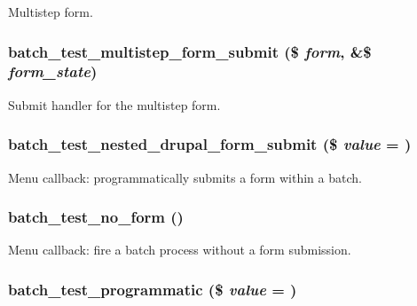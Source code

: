 \label{batch__test_8module_a27849d728f8dc56be2efe444f247a20f}
Multistep form. \hypertarget{batch__test_8module_a8bd0a1b56d07df11f2978d71a035d811}{
\subsubsection[{batch\_\-test\_\-multistep\_\-form\_\-submit}]{\setlength{\rightskip}{0pt plus 5cm}batch\_\-test\_\-multistep\_\-form\_\-submit (\$ {\em form}, \/  \&\$ {\em form\_\-state})}}
\label{batch__test_8module_a8bd0a1b56d07df11f2978d71a035d811}
Submit handler for the multistep form. \hypertarget{batch__test_8module_a72e164c6e83bd986e051745c2022ba84}{
\subsubsection[{batch\_\-test\_\-nested\_\-drupal\_\-form\_\-submit}]{\setlength{\rightskip}{0pt plus 5cm}batch\_\-test\_\-nested\_\-drupal\_\-form\_\-submit (\$ {\em value} = {})}}
\label{batch__test_8module_a72e164c6e83bd986e051745c2022ba84}
Menu callback: programmatically submits a form within a batch. \hypertarget{batch__test_8module_ad1513af97268361ff1b0cdb36a44834b}{
\subsubsection[{batch\_\-test\_\-no\_\-form}]{\setlength{\rightskip}{0pt plus 5cm}batch\_\-test\_\-no\_\-form ()}}
\label{batch__test_8module_ad1513af97268361ff1b0cdb36a44834b}
Menu callback: fire a batch process without a form submission. \hypertarget{batch__test_8module_adda6d95301653091f90c0117b69af063}{
\subsubsection[{batch\_\-test\_\-programmatic}]{\setlength{\rightskip}{0pt plus 5cm}batch\_\-test\_\-programmatic (\$ {\em value} = {})}}
